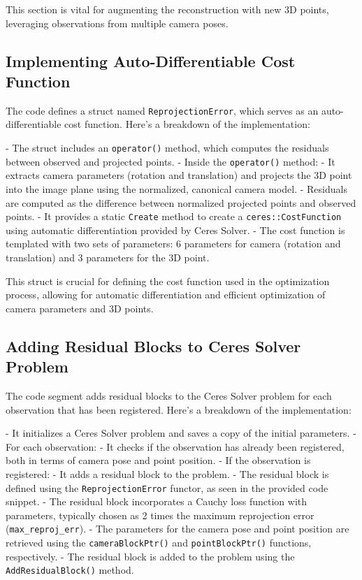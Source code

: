 \documentclass{article}
\begin{document}
This section is vital for augmenting the reconstruction with new 3D points, leveraging observations from multiple camera poses.



\subsection{Implementing Auto-Differentiable Cost Function}

The code defines a struct named \texttt{ReprojectionError}, which serves as an auto-differentiable cost function. Here's a breakdown of the implementation:

- The struct includes an \texttt{operator()} method, which computes the residuals between observed and projected points.
- Inside the \texttt{operator()} method:
  - It extracts camera parameters (rotation and translation) and projects the 3D point into the image plane using the normalized, canonical camera model.
  - Residuals are computed as the difference between normalized projected points and observed points.
- It provides a static \texttt{Create} method to create a \texttt{ceres::CostFunction} using automatic differentiation provided by Ceres Solver.
- The cost function is templated with two sets of parameters: 6 parameters for camera (rotation and translation) and 3 parameters for the 3D point.

This struct is crucial for defining the cost function used in the optimization process, allowing for automatic differentiation and efficient optimization of camera parameters and 3D points.


\subsection{Adding Residual Blocks to Ceres Solver Problem}

The code segment adds residual blocks to the Ceres Solver problem for each observation that has been registered. Here's a breakdown of the implementation:

- It initializes a Ceres Solver problem and saves a copy of the initial parameters.
- For each observation:
  - It checks if the observation has already been registered, both in terms of camera pose and point position.
  - If the observation is registered:
    - It adds a residual block to the problem.
    - The residual block is defined using the \texttt{ReprojectionError} functor, as seen in the provided code snippet.
    - The residual block incorporates a Cauchy loss function with parameters, typically chosen as 2 times the maximum reprojection error (\texttt{max\_reproj\_err}).
    - The parameters for the camera pose and point position are retrieved using the \texttt{cameraBlockPtr()} and \texttt{pointBlockPtr()} functions, respectively.
    - The residual block is added to the problem using the \texttt{AddResidualBlock()} method.
\end{document}
